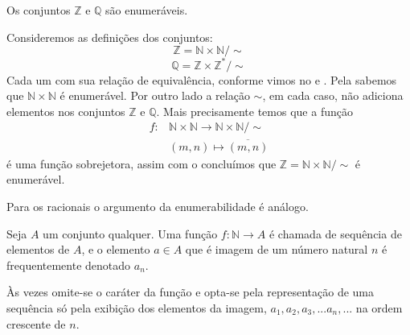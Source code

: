 \documentclass[../main.tex]{subfiles}
\begin{document}
\begin{corol}
    Os conjuntos $\mathbb{Z}$ e $\mathbb{Q}$ são enumeráveis.
\end{corol}
\begin{dem}
    Consideremos as definições dos conjuntos:
    \[ \mathbb{Z} = \mathbb{N} \times \mathbb{N}/\sim \]
    \[ \mathbb{Q} = \mathbb{Z} \times \mathbb{Z}^*/\sim \]
    Cada um com sua relação de equivalência, conforme vimos no  e .
    Pela  sabemos que $\mathbb{N} \times \mathbb{N}$ é enumerável. Por outro lado a relação $\sim$, em cada caso, não adiciona elementos nos conjuntos $\mathbb{Z}$ e $\mathbb{Q}$. Mais precisamente temos que a função
    \begin{align*}
        f \colon &\mathbb{N} \times \mathbb{N} \to \mathbb{N} \times \mathbb{N} / \sim \\
                & (m,n) \mapsto \overline{(m,n)}
    \end{align*}
    é uma função sobrejetora, assim com o  concluímos que $\mathbb{Z} = \mathbb{N} \times \mathbb{N} / \sim$ é enumerável.

    Para os racionais o argumento da enumerabilidade é análogo.
\end{dem}
\begin{defi}
    Seja $A$ um conjunto qualquer. Uma função $f: \mathbb{N} \to A$ é chamada de sequência de elementos de $A$, e o elemento $a \in A$ que é imagem de um número natural $n$ é frequentemente denotado $a_n$.
\end{defi}
\begin{obs}
    Às vezes omite-se o caráter da função e opta-se pela representação de uma sequência só pela exibição dos elementos da imagem, $a_1, a_2, a_3,...a_n,...$  na ordem crescente de $n$.
\end{obs}
\end{document}
